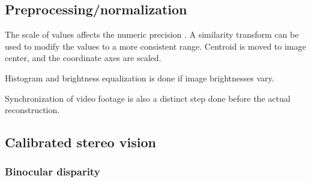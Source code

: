 







\subsection{Preprocessing/normalization} %

The scale of values affects the numeric precision \cite{hartley1997defense,hartley03multiview}.
A similarity transform can be used to modify the values to a more consistent range.
Centroid is moved to image center, and the coordinate axes are scaled.


Histogram and brightness equalization is done if image brightnesses vary.

Synchronization of video footage is also a distinct step done before the actual reconstruction.




\subsection{Calibrated stereo vision} %

\subsubsection{Binocular disparity} \label{sec:binocular} %

